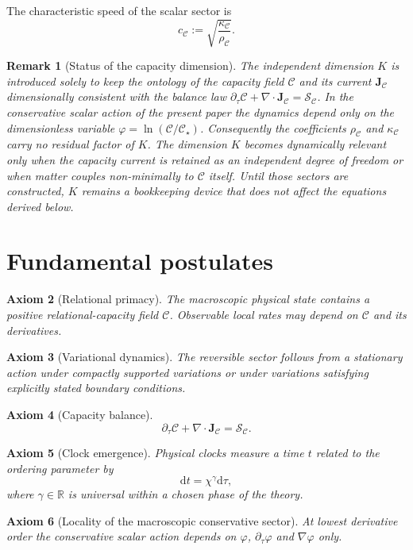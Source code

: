 \documentclass[11pt,a4paper]{article}
\newtheorem{axiom}{Axiom}[section]
\newtheorem{remark}[axiom]{Remark}
\newcommand{\C}{\mathcal{C}}
\newcommand{\Cs}{\mathcal{C}_\star}
\newcommand{\Jc}{\mathbf{J}_{\mathcal{C}}}
\newcommand{\Sc}{\mathcal{S}_{\mathcal{C}}}
\renewcommand{\dd}{\mathrm{d}}
\newcommand{\rhoC}{\rho_{\mathcal{C}}}
\newcommand{\kC}{\kappa_{\mathcal{C}}}
\begin{document}
The characteristic speed of the scalar sector is
\[
c_{\mathcal{C}}:=\sqrt{\frac{\kC}{\rhoC}}.
\]

\begin{remark}[Status of the capacity dimension]
The independent dimension \(K\) is introduced solely to keep the ontology of the capacity field \(\C\) and its current \(\Jc\) dimensionally consistent with the balance law \(\partial_\tau\C+\nabla\cdot\Jc=\Sc\). In the conservative scalar action of the present paper the dynamics depend only on the dimensionless variable \(\varphi=\ln(\C/\Cs)\). Consequently the coefficients \(\rhoC\) and \(\kC\) carry no residual factor of \(K\). The dimension \(K\) becomes dynamically relevant only when the capacity current is retained as an independent degree of freedom or when matter couples non-minimally to \(\C\) itself. Until those sectors are constructed, \(K\) remains a bookkeeping device that does not affect the equations derived below.
\end{remark}

\section{Fundamental postulates}

\begin{axiom}[Relational primacy]
The macroscopic physical state contains a positive relational-capacity field \(\C\). Observable local rates may depend on \(\C\) and its derivatives.
\end{axiom}

\begin{axiom}[Variational dynamics]
The reversible sector follows from a stationary action under compactly supported variations or under variations satisfying explicitly stated boundary conditions.
\end{axiom}

\begin{axiom}[Capacity balance]
\[
\partial_\tau\C+\nabla\cdot\Jc=\Sc.
\]
\end{axiom}

\begin{axiom}[Clock emergence]
Physical clocks measure a time \(t\) related to the ordering parameter by
\[
\dd t=\chi^\gamma\dd\tau,
\]
where \(\gamma\in\mathbb{R}\) is universal within a chosen phase of the theory.
\end{axiom}

\begin{axiom}[Locality of the macroscopic conservative sector]
At lowest derivative order the conservative scalar action depends on \(\varphi\), \(\partial_\tau\varphi\) and \(\nabla\varphi\) only.
\end{axiom}
\end{document}
